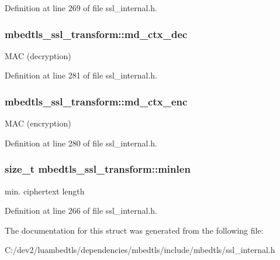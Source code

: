 Definition at line 269 of file ssl\-\_\-internal.\-h.

\hypertarget{structmbedtls__ssl__transform_a9d9d8245fb1000d30a9a63191cddf0e0}{
\subsubsection[{md\-\_\-ctx\-\_\-dec}]{ mbedtls\-\_\-ssl\-\_\-transform\-::md\-\_\-ctx\-\_\-dec}}\label{structmbedtls__ssl__transform_a9d9d8245fb1000d30a9a63191cddf0e0}
M\-A\-C (decryption) 

Definition at line 281 of file ssl\-\_\-internal.\-h.

\hypertarget{structmbedtls__ssl__transform_a17f516488ea4254947d296a53c527af8}{
\subsubsection[{md\-\_\-ctx\-\_\-enc}]{ mbedtls\-\_\-ssl\-\_\-transform\-::md\-\_\-ctx\-\_\-enc}}\label{structmbedtls__ssl__transform_a17f516488ea4254947d296a53c527af8}
M\-A\-C (encryption) 

Definition at line 280 of file ssl\-\_\-internal.\-h.

\hypertarget{structmbedtls__ssl__transform_aaa43c099c7bc4f20f283362fd2feb619}{
\subsubsection[{minlen}]{\setlength{\rightskip}{0pt plus 5cm}size\-\_\-t mbedtls\-\_\-ssl\-\_\-transform\-::minlen}}\label{structmbedtls__ssl__transform_aaa43c099c7bc4f20f283362fd2feb619}
min. ciphertext length 

Definition at line 266 of file ssl\-\_\-internal.\-h.



The documentation for this struct was generated from the following file\-:\begin{DoxyCompactItemize}
\item 
C\-:/dev2/luambedtls/dependencies/mbedtls/include/mbedtls/ssl\-\_\-internal.\-h\end{DoxyCompactItemize}
